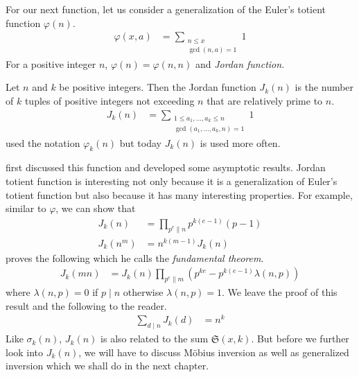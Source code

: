 \documentclass[elemannt.tex]{subfile}
\begin{document}
	For our next function, let us consider a generalization of the Euler's totient function $\varphi(n)$.
		\begin{align*}
			\varphi(x,a)
				& = \sum_{\substack{n\leq x\\\gcd(n,a)=1}}1
		\end{align*}
	For a positive integer $n$, $\varphi(n)=\varphi(n,n)$ and \textit{Jordan function}.
		\begin{definition}
			Let $n$ and $k$ be positive integers. Then the Jordan function $J_{k}(n)$ is the number of $k$ tuples of positive integers not exceeding $n$ that are relatively prime to $n$.
				\begin{align*}
					J_{k}(n)
						& = \sum_{\substack{1\leq a_{1},\ldots,a_{k}\leq n\\\gcd(a_{1},\ldots,a_{k},n)=1}}1
				\end{align*}
			\textcite{lehmer_1900} used the notation $\varphi_{k}(n)$ but today $J_{k}(n)$ is used more often.
		\end{definition}
	\textcite[Page $95-97$]{jordan_1989} first discussed this function and \textcite{lehmer_1900} developed some asymptotic results. Jordan totient function is interesting not only because it is a generalization of Euler's totient function but also because it has many interesting properties.
	For example, similar to $\varphi$, we can show that
		\begin{align*}
			J_{k}(n)
				& = \prod_{p^{e}\|n}p^{k(e-1)}(p-1)\\
			J_{k}(n^{m})
				& = n^{k(m-1)}J_{k}(n)
		\end{align*}
	\textcite[Theorem VI]{lehmer_1900} proves the following which he calls the \textit{fundamental theorem}.
		\begin{align}
			J_{k}(mn)
				& = J_{k}(n)\prod_{p^{e}\parallel m}\left(p^{ke}-p^{k(e-1)}\lambda(n,p)\right)\label{thm:lehfund}
		\end{align}
	where $\lambda(n,p)=0$ if $p\mid n$ otherwise $\lambda(n,p)=1$. We leave the proof of this result and the following to the reader.
		\begin{align*}
			\sum_{d\mid n}J_{k}(d)
				& = n^{k}
		\end{align*}
	 Like $\sigma_{k}(n)$, $J_{k}(n)$ is also  related to the sum $\mathfrak{S}(x, k)$. But before we further look into $J_{k}(n)$, we will have to discuss M\"{o}bius inversion as well as generalized inversion which we shall do in the next chapter.
\end{document}
